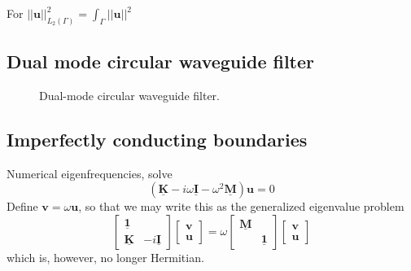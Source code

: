 \documentclass[11pt, a4paper]{article}
\begin{document}
For $||\mathbf{u}||_{L_2(\Gamma)}^2 = \int_{\Gamma} ||\mathbf{u}||^2$

\subsection{Dual mode circular waveguide filter}
\label{subsec:examples-dmcwf}


\begin{figure}[h]
    \centering
    
    \caption{Dual-mode circular waveguide filter.}
    \label{fig:DMCWF}
\end{figure}






\subsection{Imperfectly conducting boundaries}
\label{subsec:examples-impedance}

Numerical eigenfrequencies, solve
\begin{equation}
    (\mathbf{\underline{K}} - i \omega \mathbf{\underline{I}} - \omega^2 \mathbf{\underline{M}}) \mathbf{u} = 0
\end{equation}
Define $\mathbf{v} = \omega \mathbf{u}$, so that we may write this as the
generalized eigenvalue problem
\begin{equation}
    \begin{bmatrix}
        \boldsymbol{\underline{1}} & \\
        \mathbf{\underline{K}} & -i \mathbf{\underline{I}}
    \end{bmatrix}
    \begin{bmatrix}
        \mathbf{v} \\
        \mathbf{u}
    \end{bmatrix}
    =
    \omega
    \begin{bmatrix}
        \boldsymbol{\underline{M}} & \\
         & \boldsymbol{\underline{1}}
    \end{bmatrix}
    \begin{bmatrix}
        \mathbf{v} \\
        \mathbf{u}
    \end{bmatrix}
\end{equation}
which is, however, no longer Hermitian.
\end{document}
